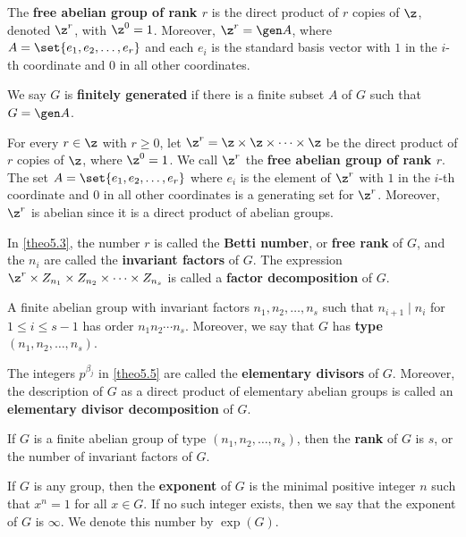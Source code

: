  The \textbf{free abelian group of rank $r$} is the direct product of $r$ copies of $\z$, denoted $\z^r$, with $\z^0 = 1$. Moreover, $\z^r = \gen A$, where $A = \set{e_1, e_2, \ldots, e_r}$ and each $e_i$ is the standard basis vector with $1$ in the $i$-th coordinate and $0$ in all other coordinates.
\begin{defn}
    \item We say $G$ is \textbf{finitely generated} if there is a finite subset $A$ of $G$ such that $G = \gen A$.
    \item For every $r \in \z$ with $r \geq 0$, let $\z^r = \z \times \z \times \cdots \times \z$ be the direct product of $r$ copies of $\z$, where $\z^0 = 1$. We call $\z^r$ the \textbf{free abelian group of rank $r$}. The set $A = \set{e_1, e_2, \ldots, e_r}$ where $e_i$ is the element of $\z^r$ with $1$ in the $i$-th coordinate and $0$ in all other coordinates is a generating set for $\z^r$. Moreover, $\z^r$ is abelian since it is a direct product of abelian groups.
    \item In \autoref{theo5.3}, the number $r$ is called the \textbf{Betti number}, or \textbf{free rank} of $G$, and the $n_i$ are called the \textbf{invariant factors} of $G$. The expression $\z^r \times Z_{n_1} \times Z_{n_2} \times \cdots \times Z_{n_s}$ is called a \textbf{factor decomposition} of $G$.
    \item A finite abelian group with invariant factors $n_1, n_2, \ldots, n_s$ such that $n_{i + 1} \mid n_i$ for $1 \leq i \leq s - 1$ has order $n_1 n_2 \cdots n_s$. Moreover, we say that $G$ has \textbf{type} $(n_1, n_2, \ldots, n_s)$.
    \item The integers $p^{\beta_j}$ in \autoref{theo5.5} are called the \textbf{elementary divisors} of $G$. Moreover, the description of $G$ as a direct product of elementary abelian groups is called an \textbf{elementary divisor decomposition} of $G$.
    \item If $G$ is a finite abelian group of type $(n_1, n_2, \ldots, n_s)$, then the \textbf{rank} of $G$ is $s$, or the number of invariant factors of $G$.
    \item If $G$ is any group, then the \textbf{exponent} of $G$ is the minimal positive integer $n$ such that $x^n = 1$ for all $x \in G$. If no such integer exists, then we say that the exponent of $G$ is $\infty$. We denote this number by $\exp(G)$.
\end{defn}

